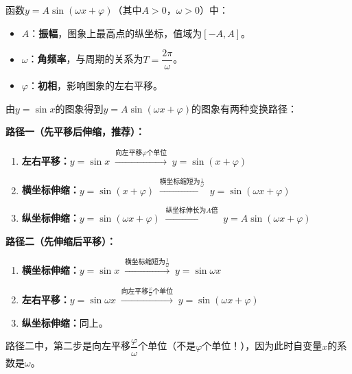 \documentclass[12pt, a4paper]{ctexart}
\begin{document}
\begin{knowledgebox}[正弦型函数的三个参数]
函数$y=A\sin(\omega x+\varphi)$（其中$A>0$，$\omega>0$）中：

\begin{itemize}[leftmargin=2em]
  \item $A$：\textbf{振幅}，图象上最高点的纵坐标，值域为$[-A,A]$。
  \item $\omega$：\textbf{角频率}，与周期的关系为$T=\dfrac{2\pi}{\omega}$。
  \item $\varphi$：\textbf{初相}，影响图象的左右平移。
\end{itemize}
\end{knowledgebox}

\begin{knowledgebox}[图象变换（重点！）]
由$y=\sin x$的图象得到$y=A\sin(\omega x+\varphi)$的图象有两种变换路径：

\medskip
\textbf{路径一（先平移后伸缩，推荐）：}

\begin{enumerate}[leftmargin=2em]
  \item \textbf{左右平移：}$y=\sin x\;\xrightarrow{\text{向左平移}\varphi\text{个单位}}\;y=\sin(x+\varphi)$
  \item \textbf{横坐标伸缩：}$y=\sin(x+\varphi)\;\xrightarrow{\text{横坐标缩短为}\frac{1}{\omega}}\;y=\sin(\omega x+\varphi)$
  \item \textbf{纵坐标伸缩：}$y=\sin(\omega x+\varphi)\;\xrightarrow{\text{纵坐标伸长为}A\text{倍}}\;y=A\sin(\omega x+\varphi)$
\end{enumerate}

\textbf{路径二（先伸缩后平移）：}

\begin{enumerate}[leftmargin=2em]
  \item \textbf{横坐标伸缩：}$y=\sin x\;\xrightarrow{\text{横坐标缩短为}\frac{1}{\omega}}\;y=\sin\omega x$
  \item \textbf{左右平移：}$y=\sin\omega x\;\xrightarrow{\text{向左平移}\frac{\varphi}{\omega}\text{个单位}}\;y=\sin(\omega x+\varphi)$
  \item \textbf{纵坐标伸缩：}同上。
\end{enumerate}

\medskip
\begin{warnbox}[易错提醒]
路径二中，第二步是向左平移$\dfrac{\varphi}{\omega}$个单位（不是$\varphi$个单位！），因为此时自变量$x$的系数是$\omega$。
\end{warnbox}
\end{knowledgebox}
\end{document}

